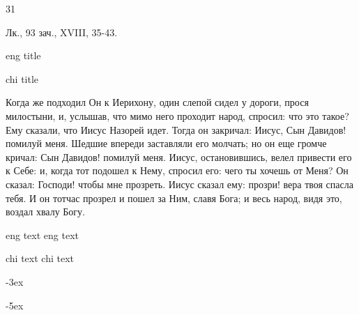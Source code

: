 31

\onehalfspacing %

\onehalfspacing %

\Large%

Лк., 93 зач., XVIII, 35-43.

eng title

chi title

Когда же подходил Он к Иерихону, один слепой сидел у дороги, прося милостыни,
и, услышав, что мимо него проходит народ, спросил: что это такое?
Ему сказали, что Иисус Назорей идет.
Тогда он закричал: Иисус, Сын Давидов! помилуй меня.
Шедшие впереди заставляли его молчать; но он еще громче кричал: Сын Давидов! помилуй меня.
Иисус, остановившись, велел привести его к Себе: и, когда тот подошел к Нему, спросил его:
чего ты хочешь от Меня? Он сказал: Господи! чтобы мне прозреть.
Иисус сказал ему: прозри! вера твоя спасла тебя.
И он тотчас прозрел и пошел за Ним, славя Бога; и весь народ, видя это, воздал хвалу Богу. 

eng text
eng text

chi text
chi text

\Huge%

-3ex%

-5ex%
